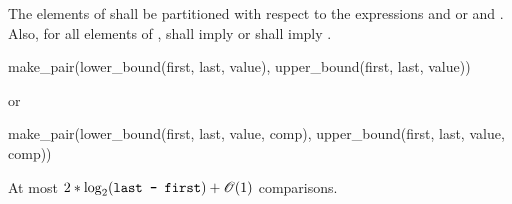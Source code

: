 
\begin{itemdescr}
\pnum
\requires
The elements
of
shall be partitioned with respect to the expressions
and
or
and
.
Also, for all elements
of
\tcode{[first, last)},
shall imply
or
shall imply
.

\pnum
\returns
\begin{codeblock}
make_pair(lower_bound(first, last, value),
          upper_bound(first, last, value))
\end{codeblock}
or
\begin{codeblock}
make_pair(lower_bound(first, last, value, comp),
          upper_bound(first, last, value, comp))
\end{codeblock}

\pnum
\complexity
At most
$2 * \log_2(\texttt{last - first}) + \mathscr{O}(1)$
comparisons.
\end{itemdescr}

